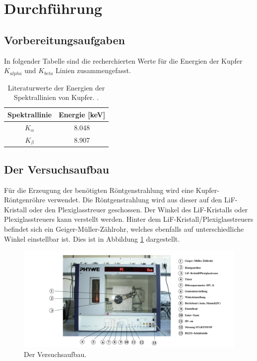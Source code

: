 \section{Durchführung}
\label{sec:Durchführung}
\subsection{Vorbereitungsaufgaben}
\label{sec:vorbereitung}
In folgender Tabelle sind die recherchierten Werte für die Energien der Kupfer $K_{alpha}$ und $K_{beta}$
Linien zusammengefasst.
\begin{table}[H]
    \centering
    \caption{Literaturwerte der Energien der Spektrallinien von Kupfer. \cite{AP03}.}
    \label{tab:Literaturwerte}
    \begin{tabular}{S S}
      \toprule
      {Spektrallinie} & {Energie [\si{\kilo\electronvolt}]} \\
      \midrule
    {$K_{\alpha}$} & 8.048 \\
    {$K_{\beta} $} & 8.907 \\
      \bottomrule
    \end{tabular}
  \end{table}
\noindent

\subsection{Der Versuchsaufbau}
Für die Erzeugung der benötigten Röntgenstrahlung wird eine Kupfer-Röntgenröhre verwendet. Die Röntgenstrahlung wird aus dieser auf den LiF-Kristall oder den Plexiglasstreuer geschossen. Der Winkel des
LiF-Kristalls oder Plexiglasstreuers kann verstellt werden. Hinter dem LiF-Kristall/Plexiglasstreuers befindet sich ein Geiger-Müller-Zählrohr, welches ebenfalls auf unterschiedliche Winkel einstellbar ist.
Dies ist in Abbildung \ref{fig:versuchsaufbau1} dargestellt.
\begin{figure}[H]
  \centering
  \includegraphics[scale=0.2]{content/versuchsaufbau1.png}
  \caption{Der Versuchsaufbau.}
  \label{fig:versuchsaufbau1}
\end{figure}

